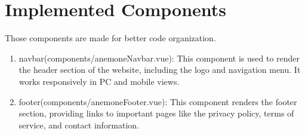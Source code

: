 \section{Implemented Components}
Those components are made for better code organization.
\begin{enumerate}
	\item navbar(components/anemoneNavbar.vue): This component is used to render the header section of the website, including the logo and navigation menu. It works responsively in PC and mobile views.
	\item footer(components/anemoneFooter.vue): This component renders the footer section, providing links to important pages like the privacy policy, terms of service, and contact information.
\end{enumerate}